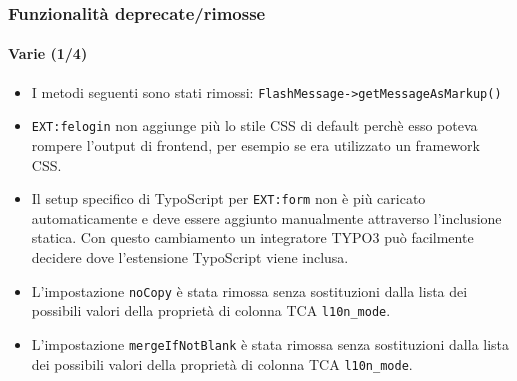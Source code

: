 \begin{frame}[fragile]
	\frametitle{Funzionalità deprecate/rimosse}
	\framesubtitle{Varie (1/4)}


	\begin{itemize}
		\item I metodi seguenti sono stati rimossi:\newline
			\small\texttt{FlashMessage->getMessageAsMarkup()}\normalsize
		\item \texttt{EXT:felogin} non aggiunge più lo stile CSS di default perchè esso
			poteva rompere l'output di frontend, per esempio se era utilizzato un framework CSS.
		\item Il setup specifico di TypoScript per \texttt{EXT:form} non è più caricato automaticamente
			e deve essere aggiunto manualmente attraverso l'inclusione statica.
			Con questo cambiamento un integratore TYPO3 può facilmente decidere dove l'estensione TypoScript viene inclusa.
		\item L'impostazione \texttt{noCopy} è stata rimossa senza sostituzioni dalla lista 
			dei possibili valori della proprietà di colonna TCA \texttt{l10n\_mode}.
		\item L'impostazione \texttt{mergeIfNotBlank} è stata rimossa senza sostituzioni dalla lista
			dei possibili valori della proprietà di colonna TCA \texttt{l10n\_mode}.

	\end{itemize}

\end{frame}



